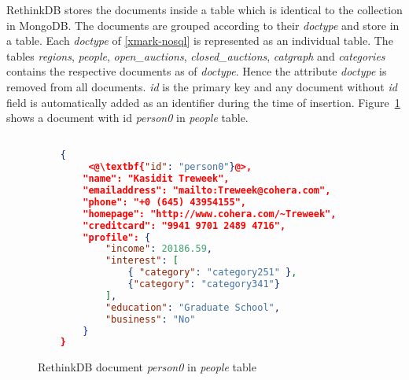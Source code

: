 RethinkDB stores the documents inside a table which is identical to the collection in MongoDB. 
The documents are grouped according to their \textit{doctype} and store in a table.
Each \textit{doctype} of \ref{xmark-nosql} is represented as an individual table. 
The tables \textit{regions}, \textit{people}, \textit{open\_auctions}, \textit{closed\_auctions}, \textit{catgraph} and \textit{categories} contains the respective documents as of \textit{doctype}. Hence the attribute \textit{doctype} is removed from all documents.  \textit{id} is the primary key and any document without \textit{id} field is automatically added as an identifier during the time of insertion. Figure~\ref{code:rethindb-person0} shows a document with id \textit{person0} in \textit{people} table.
\begin{figure}[hbt]
\centering
\begin{lstlisting}[language=JSON,basicstyle =\scriptsize]

	{
		 <@\textbf{"id": "person0"}@>,
		"name": "Kasidit Treweek",
		"emailaddress": "mailto:Treweek@cohera.com",
		"phone": "+0 (645) 43954155",
		"homepage": "http://www.cohera.com/~Treweek",
		"creditcard": "9941 9701 2489 4716",
		"profile": {
			"income": 20186.59,
			"interest": [
			    { "category": "category251" },
				{"category": "category341"}
			],
			"education": "Graduate School",
			"business": "No"
		}
	}
\end{lstlisting}
\caption{RethinkDB document \textit{person0} in \textit{people} table}
\label{code:rethindb-person0}
\end{figure}
